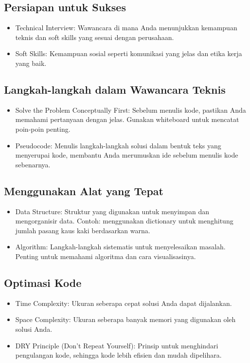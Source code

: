 \documentclass{article}
\begin{document}
\subsection{Persiapan untuk Sukses}
\begin{itemize}
    \item Technical Interview: Wawancara di mana Anda menunjukkan kemampuan teknis dan soft skills yang sesuai dengan perusahaan.
    \item Soft Skills: Kemampuan sosial seperti komunikasi yang jelas dan etika kerja yang baik.
\end{itemize}

\subsection{Langkah-langkah dalam Wawancara Teknis}
\begin{itemize}
    \item Solve the Problem Conceptually First: Sebelum menulis kode, pastikan Anda memahami pertanyaan dengan jelas. Gunakan whiteboard untuk mencatat poin-poin penting.
    \item Pseudocode: Menulis langkah-langkah solusi dalam bentuk teks yang menyerupai kode, membantu Anda merumuskan ide sebelum menulis kode sebenarnya.
\end{itemize}

\subsection{Menggunakan Alat yang Tepat}
\begin{itemize}
    \item Data Structure: Struktur yang digunakan untuk menyimpan dan mengorganisir data. Contoh: menggunakan dictionary untuk menghitung jumlah pasang kaus kaki berdasarkan warna.
    \item Algorithm: Langkah-langkah sistematis untuk menyelesaikan masalah. Penting untuk memahami algoritma dan cara visualisasinya.
\end{itemize}

\subsection{Optimasi Kode}
\begin{itemize}
    \item Time Complexity: Ukuran seberapa cepat solusi Anda dapat dijalankan.
    \item Space Complexity: Ukuran seberapa banyak memori yang digunakan oleh solusi Anda.
    \item DRY Principle (Don't Repeat Yourself): Prinsip untuk menghindari pengulangan kode, sehingga kode lebih efisien dan mudah dipelihara.
\end{itemize}
\end{document}

